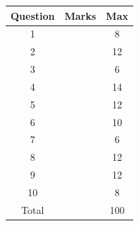 \documentclass[12pt]{article}
\theoremstyle{Conjecture}
\theoremstyle{example}
\theoremstyle{remark}
\theoremstyle{lemma}
\theoremstyle{definition}
\theoremstyle{corol}
\theoremstyle{proposition}
\theoremstyle{condition}
\begin{document}
\begin{table}[!h]
\centering
\begin{tabular}{|c|c|c|}\hline
Question & Marks & Max\\ \hline
1 &  & 8\\ \hline
2 &  & 12\\ \hline
3 &  & 6\\ \hline
4 &  & 14\\ \hline
5 &  & 12\\ \hline
6 &  & 10\\ \hline
7 &  & 6\\ \hline
8 &  & 12\\ \hline
9 &  & 12\\ \hline
10 &  & 8\\ \hline
Total &  & 100\\ \hline
\end{tabular}
\end{table}


\newpage 
\end{document}
